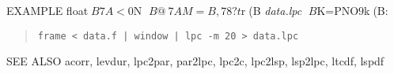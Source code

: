
\begin{qsection}{EXAMPLE}
float$B7A<0$N%
$B@~7AM=B,78?t$r(B {\em data.lpc} $B$K=PNO$9$k(B:
\begin{quote}
 \verb!frame < data.f | window | lpc -m 20 > data.lpc!
\end{quote} 
\end{qsection}

\begin{qsection}{SEE ALSO}
 acorr, levdur, lpc2par, par2lpc, lpc2c, lpc2lsp, lsp2lpc, 
 ltcdf, lspdf
\end{qsection}
